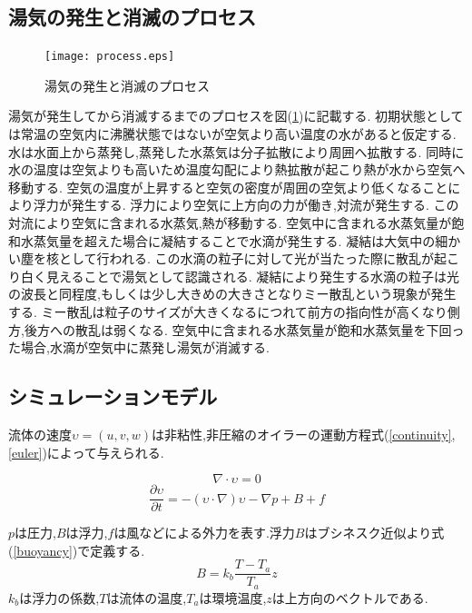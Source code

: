 \documentclass[submit,techrep]{ipsj}
\begin{document}
\subsection{湯気の発生と消滅のプロセス}
\begin{figure}[h]
\centering
\texttt{[image: process.eps]}
\caption{湯気の発生と消滅のプロセス}
\label{process}
\end{figure}
湯気が発生してから消滅するまでのプロセスを図(\ref{process})に記載する.	
初期状態としては常温の空気内に沸騰状態ではないが空気より高い温度の水があると仮定する.
水は水面上から蒸発し,蒸発した水蒸気は分子拡散により周囲へ拡散する.
同時に水の温度は空気よりも高いため温度勾配により熱拡散が起こり熱が水から空気へ移動する.
空気の温度が上昇すると空気の密度が周囲の空気より低くなることにより浮力が発生する.
浮力により空気に上方向の力が働き,対流が発生する.
この対流により空気に含まれる水蒸気,熱が移動する.
空気中に含まれる水蒸気量が飽和水蒸気量を超えた場合に凝結することで水滴が発生する.
凝結は大気中の細かい塵を核として行われる.
この水滴の粒子に対して光が当たった際に散乱が起こり白く見えることで湯気として認識される.
凝結により発生する水滴の粒子は光の波長と同程度,もしくは少し大きめの大きさとなりミー散乱という現象が発生する.
ミー散乱は粒子のサイズが大きくなるにつれて前方の指向性が高くなり側方,後方への散乱は弱くなる.
空気中に含まれる水蒸気量が飽和水蒸気量を下回った場合,水滴が空気中に蒸発し湯気が消滅する.

\subsection{シミュレーションモデル}

流体の速度$\upsilon=(u,v,w)$は非粘性,非圧縮のオイラーの運動方程式(\ref{continuity},\ref{euler})によって与えられる.

\begin{equation}
\label{continuity}
\nabla \cdot \upsilon = 0
\end{equation}
  \begin{equation}
  \label{euler}
  \frac{\partial \upsilon}{\partial t} = -(\upsilon \cdot \nabla)\upsilon - \nabla p + B + f
  \end{equation}

$p$は圧力,$B$は浮力,$f$は風などによる外力を表す.浮力$B$はブシネスク近似より式(\ref{buoyancy})で定義する.
\begin{equation}
\label{buoyancy}
B=k_{b}\frac{T-T_{a}}{T_{a}}z
\end{equation}
$k_{b}$は浮力の係数,$T$は流体の温度,$T_{a}$は環境温度,$z$は上方向のベクトルである.
\end{document}
